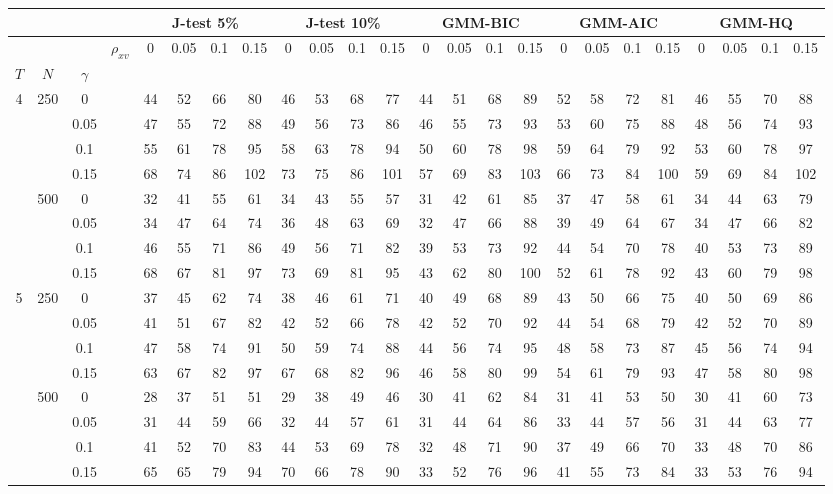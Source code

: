 \begin{tabular}{cccc|cccc|cccc|cccc|cccc|cccc} 
 \hline \hline 
\multicolumn{4}{c}{}&\multicolumn{4}{c}{J-test 5\%}&\multicolumn{4}{c}{J-test 10\%}&\multicolumn{4}{c}{GMM-BIC}&\multicolumn{4}{c}{GMM-AIC}&\multicolumn{4}{c}{GMM-HQ}\\ 
 \hline
 &  &  & $\rho_{xv}$ & 0 & 0.05 & 0.1 & 0.15 & 0 & 0.05 & 0.1 & 0.15 & 0 & 0.05 & 0.1 & 0.15 & 0 & 0.05 & 0.1 & 0.15 & 0 & 0.05 & 0.1 & 0.15 \\
$T$ & $N$ & $\gamma$ &  &  &  &  &  &  &  &  &  &  &  &  &  &  &  &  &  &  &  &  &  \\
\hline
4 & 250 & 0 &  & 44 & 52 & 66 & 80 & 46 & 53 & 68 & 77 & 44 & 51 & 68 & 89 & 52 & 58 & 72 & 81 & 46 & 55 & 70 & 88 \\
 &  & 0.05 &  & 47 & 55 & 72 & 88 & 49 & 56 & 73 & 86 & 46 & 55 & 73 & 93 & 53 & 60 & 75 & 88 & 48 & 56 & 74 & 93 \\
 &  & 0.1 &  & 55 & 61 & 78 & 95 & 58 & 63 & 78 & 94 & 50 & 60 & 78 & 98 & 59 & 64 & 79 & 92 & 53 & 60 & 78 & 97 \\
 &  & 0.15 &  & 68 & 74 & 86 & 102 & 73 & 75 & 86 & 101 & 57 & 69 & 83 & 103 & 66 & 73 & 84 & 100 & 59 & 69 & 84 & 102 \\
 \hline
 & 500 & 0 &  & 32 & 41 & 55 & 61 & 34 & 43 & 55 & 57 & 31 & 42 & 61 & 85 & 37 & 47 & 58 & 61 & 34 & 44 & 63 & 79 \\
 &  & 0.05 &  & 34 & 47 & 64 & 74 & 36 & 48 & 63 & 69 & 32 & 47 & 66 & 88 & 39 & 49 & 64 & 67 & 34 & 47 & 66 & 82 \\
 &  & 0.1 &  & 46 & 55 & 71 & 86 & 49 & 56 & 71 & 82 & 39 & 53 & 73 & 92 & 44 & 54 & 70 & 78 & 40 & 53 & 73 & 89 \\
 &  & 0.15 &  & 68 & 67 & 81 & 97 & 73 & 69 & 81 & 95 & 43 & 62 & 80 & 100 & 52 & 61 & 78 & 92 & 43 & 60 & 79 & 98 \\
 \hline
5 & 250 & 0 &  & 37 & 45 & 62 & 74 & 38 & 46 & 61 & 71 & 40 & 49 & 68 & 89 & 43 & 50 & 66 & 75 & 40 & 50 & 69 & 86 \\
 &  & 0.05 &  & 41 & 51 & 67 & 82 & 42 & 52 & 66 & 78 & 42 & 52 & 70 & 92 & 44 & 54 & 68 & 79 & 42 & 52 & 70 & 89 \\
 &  & 0.1 &  & 47 & 58 & 74 & 91 & 50 & 59 & 74 & 88 & 44 & 56 & 74 & 95 & 48 & 58 & 73 & 87 & 45 & 56 & 74 & 94 \\
 &  & 0.15 &  & 63 & 67 & 82 & 97 & 67 & 68 & 82 & 96 & 46 & 58 & 80 & 99 & 54 & 61 & 79 & 93 & 47 & 58 & 80 & 98 \\
 \hline
 & 500 & 0 &  & 28 & 37 & 51 & 51 & 29 & 38 & 49 & 46 & 30 & 41 & 62 & 84 & 31 & 41 & 53 & 50 & 30 & 41 & 60 & 73 \\
 &  & 0.05 &  & 31 & 44 & 59 & 66 & 32 & 44 & 57 & 61 & 31 & 44 & 64 & 86 & 33 & 44 & 57 & 56 & 31 & 44 & 63 & 77 \\
 &  & 0.1 &  & 41 & 52 & 70 & 83 & 44 & 53 & 69 & 78 & 32 & 48 & 71 & 90 & 37 & 49 & 66 & 70 & 33 & 48 & 70 & 86 \\
 &  & 0.15 &  & 65 & 65 & 79 & 94 & 70 & 66 & 78 & 90 & 33 & 52 & 76 & 96 & 41 & 55 & 73 & 84 & 33 & 53 & 76 & 94 \\
\hline
\end{tabular}
